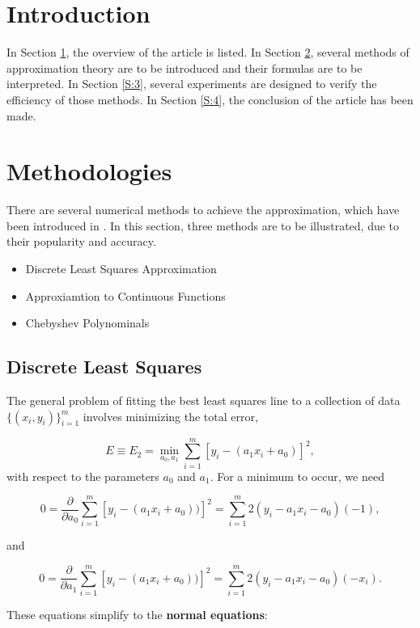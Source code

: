 \documentclass[preprint,12pt]{elsarticle}
\begin{document}
\section{Introduction}
\label{S:1}

In Section \ref{S:1}, the overview of the article is listed. In Section \ref{S:2}, several methods of approximation theory are to be introduced and their formulas are to be interpreted. In Section \ref{S:3}, several experiments are designed to verify the efficiency of those methods. In Section \ref{S:4}, the conclusion of the article has been made.

\section{Methodologies}
\label{S:2}

There are several numerical methods to achieve the approximation, which have been introduced in \cite{burden:2001na}. In this section, three methods are to be illustrated, due to their popularity and accuracy.

\begin{itemize}
\item Discrete Least Squares Approximation
\item Approxiamtion to Continuous Functions
\item Chebyshev Polynominals
\end{itemize}

\subsection{Discrete Least Squares}
\label{SS:2.1}

The general problem of fitting the best least squares line to a collection of data $\{(x_i, y_i)\}_{i=1}^m$ involves minimizing the total error,

\[
E\equiv E_2= \min_{a_0,a_1}\sum_{i=1}^{m}[y_i - (a_1x_i +a_0)]^2,
\]
with respect to the parameters $a_0$ and $a_1$. For a minimum to occur, we need

\[
0=\frac{\partial}{\partial a_0}\sum_{i=1}^{m}[y_i - (a_1x_i
+a_0))]^2=\sum_{i=1}^{m}2(y_i - a_1x_i -a_0)(-1),\]

and

\[
0=\frac{\partial}{\partial a_1}\sum_{i=1}^{m}[y_i - (a_1x_i
+a_0))]^2=\sum_{i=1}^{m}2(y_i - a_1x_i -a_0)(-x_i).
\]

These equations simplify to the \textbf{normal equations}:
\end{document}
